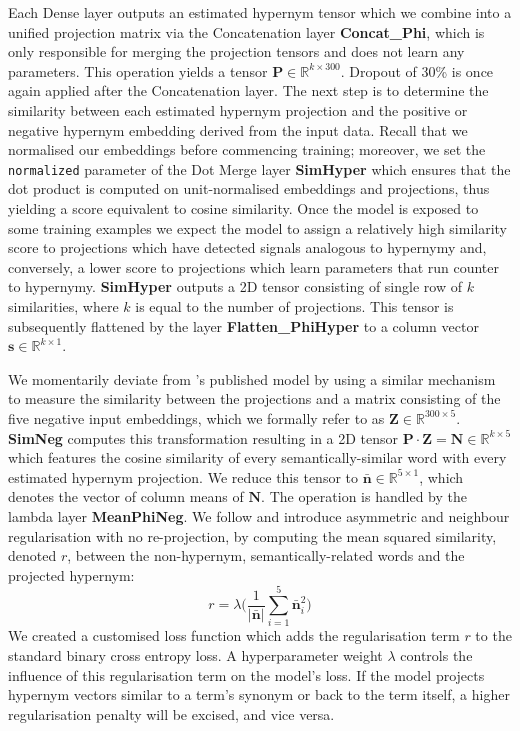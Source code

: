 Each Dense layer outputs an estimated hypernym tensor which we combine into a unified projection matrix via the Concatenation layer \textbf{Concat\_Phi}, which is only responsible for merging the projection tensors and does not learn any parameters.  This operation yields a tensor $\bm{P} \in \mathbb{R}^{k\times300}$.  Dropout of 30\% is once again applied after the Concatenation layer.  The next step is to determine the similarity between each estimated hypernym projection and the positive or negative hypernym embedding derived from the input data.  Recall that we normalised our embeddings before commencing training; moreover, we set the \texttt{normalized} parameter of the Dot Merge layer \textbf{SimHyper} which ensures that the dot product is computed on unit-normalised embeddings and projections, thus yielding a score equivalent to cosine similarity.  Once the model is exposed to some training examples we expect the model to assign a relatively high similarity score to projections which have detected signals analogous to hypernymy and, conversely, a lower score to projections which learn parameters that run counter to hypernymy.  \textbf{SimHyper} outputs a 2D tensor consisting of single row of $k$ similarities, where $k$ is equal to the number of projections. This tensor is subsequently flattened by the layer \textbf{Flatten\_PhiHyper} to a column vector $\bm{s} \in \mathbb{R}^{k\times1}$.

We momentarily deviate from \citeauthor{bernier2018crim}'s published model by using a similar mechanism to measure the similarity between the projections and a matrix consisting of the  five negative input embeddings, which we formally refer to as $\bm{Z} \in \mathbb{R}^{300\times5}$.  \textbf{SimNeg} computes this transformation resulting in a 2D tensor $\bm{P}\cdot\bm{Z} = \bm{N} \in \mathbb{R}^{k\times5}$ which features the cosine similarity of every semantically-similar word with every estimated hypernym projection.  We reduce this tensor to $\bm{\bar{n}} \in \mathbb{R}^{5\times1}$, which denotes the vector of column means of $\bm{N}$. The operation is handled by the lambda layer \textbf{MeanPhiNeg}. We follow \citep{ustalov2017negative} and introduce asymmetric and neighbour regularisation with no re-projection, by computing the mean squared similarity, denoted $r$, between the non-hypernym, semantically-related words and the projected hypernym:
\[ r = \lambda \bigg( \frac{1}{\vert \bm{\bar{n}} \vert}\sum_{i=1}^{5} \bm{\bar{n}}_i^2 \bigg)\]
We created a customised loss function which adds the regularisation term $r$ to the standard binary cross entropy loss.  A hyperparameter weight $\lambda$ controls the influence of this regularisation term on the model's loss.  If the model projects hypernym vectors similar to a term's synonym or back to the term itself, a higher regularisation penalty will be excised, and vice versa.

